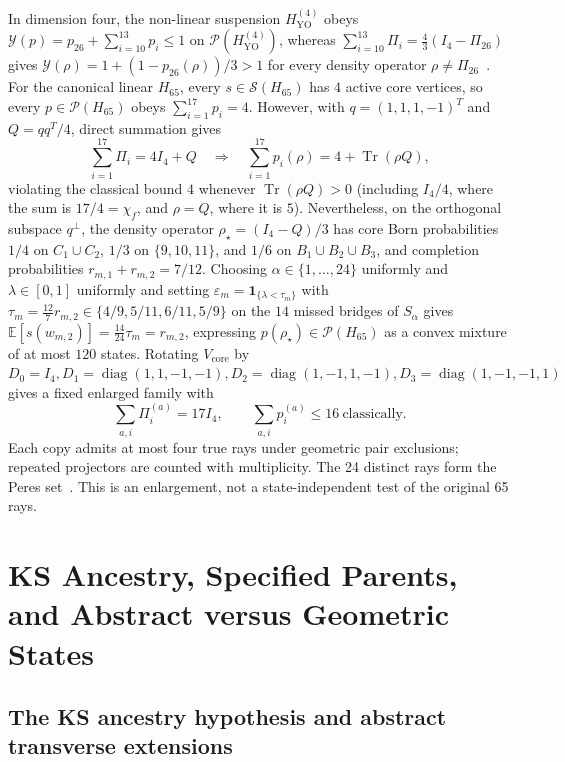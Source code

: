 \documentclass[aps,pra,reprint,superscriptaddress,longbibliography,nofootinbib,floatfix,10pt]{revtex4-2}
\theoremstyle{definition}\newtheorem{definition}[theorem]{Definition}
\theoremstyle{remark}\newtheorem{remark}[theorem]{Remark}
\newcommand{\Sc}{\mathcal S}\newcommand{\Cc}{\mathcal C}
\newcommand{\YO}{\mathrm{YO}}\newcommand{\ip}[2]{\langle #1,#2\rangle}
\DeclareMathOperator{\diag}{diag}\DeclareMathOperator{\Tr}{Tr}\DeclareMathOperator{\tr}{tr}
\begin{document}
In dimension four, the non-linear suspension $H_{\YO}^{(4)}$ obeys $\mathcal Y(p)=p_{26}+\sum_{i=10}^{13}p_i\le 1$ on $\mathcal P(H_{\YO}^{(4)})$, whereas $\sum_{i=10}^{13}\Pi_i=\frac43(I_4-\Pi_{26})$ gives $\mathcal Y(\rho)=1+(1-p_{26}(\rho))/3>1$ for every density operator $\rho\ne\Pi_{26}$~\cite{cabello2015sic}. For the canonical linear $H_{65}$, every $s\in\Sc(H_{65})$ has $4$ active core vertices, so every $p\in\mathcal P(H_{65})$ obeys $\sum_{i=1}^{17}p_i=4$. However, with $q=(1,1,1,-1)^T$ and $Q=qq^T/4$, direct summation gives
\begin{equation}\label{d:eq:core-projector-sum}
\sum_{i=1}^{17}\Pi_i=4I_4+Q\quad\Longrightarrow\quad \sum_{i=1}^{17}p_i(\rho)=4+\Tr(\rho Q),
\end{equation}
violating the classical bound $4$ whenever $\Tr(\rho Q)>0$ (including $I_4/4$, where the sum is $17/4=\chi_f$, and $\rho=Q$, where it is $5$). Nevertheless, on the orthogonal subspace $q^\perp$, the density operator $\rho_\star=(I_4-Q)/3$ has core Born probabilities $1/4$ on $C_1\cup C_2$, $1/3$ on $\{9,10,11\}$, and $1/6$ on $B_1\cup B_2\cup B_3$, and completion probabilities $r_{m,1}+r_{m,2}=7/12$. Choosing $\alpha\in\{1,\ldots,24\}$ uniformly and $\lambda\in[0,1]$ uniformly and setting $\varepsilon_m=\mathbf 1_{\{\lambda<\tau_m\}}$ with $\tau_m=\frac{12}{7}r_{m,2}\in\{4/9,5/11,6/11,5/9\}$ on the $14$ missed bridges of $S_\alpha$ gives $\mathbb E[s(w_{m,2})]=\frac{14}{24}\tau_m=r_{m,2}$, expressing $p(\rho_\star)\in\mathcal P(H_{65})$ as a convex mixture of at most $120$ states. Rotating $V_{\mathrm{core}}$ by $D_0=I_4,D_1=\diag(1,1,-1,-1),D_2=\diag(1,-1,1,-1),D_3=\diag(1,-1,-1,1)$ gives a fixed enlarged family with
\begin{equation}
\sum_{a,i}\Pi_i^{(a)}=17I_4,\qquad\sum_{a,i}p_i^{(a)}\le16\ \text{classically}.
\end{equation}
Each copy admits at most four true rays under geometric pair exclusions; repeated projectors are counted with multiplicity. The 24 distinct rays form the Peres set~\cite{peres-91}. This is an enlargement, not a state-independent test of the original 65 rays.

\section{KS Ancestry, Specified Parents, and Abstract versus Geometric States}\label{sec:ancestry}\label{sec:cabello-completion}\label{sec:cabello45}

\subsection{The KS ancestry hypothesis and abstract transverse extensions}
\end{document}
